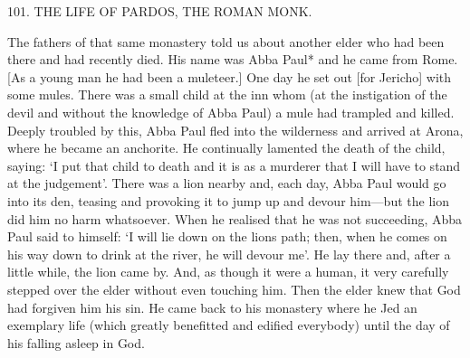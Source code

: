 101.
THE LIFE OF PARDOS, THE ROMAN MONK.

The fathers of that same monastery told us about another elder who
had been there and had recently died.
His name was Abba Paul*
and he came from Rome.
[As a young man he had been a muleteer.]
One day he set out [for Jericho] with some mules.
There was a small
child at the inn whom (at the instigation of the devil and without
the knowledge of Abba Paul) a mule had trampled and killed.
Deeply troubled by this, Abba Paul fled into the wilderness and
arrived at Arona, where he became an anchorite.
He continually
lamented the death of the child, saying: `I put that child to death and it is as a murderer that I will have to stand at the judgement'.
There was a lion nearby and, each day, Abba Paul would go into
its den, teasing and provoking it to jump up and devour him—but
the lion did him no harm whatsoever.
When he realised that he was
not succeeding, Abba Paul said to himself: `I will lie down on the
lion\textquotesingle s path; then, when he comes on his way down to drink at the
river, he will devour me'.
He lay there and, after a little while, the
lion came by.
And, as though it were a human, it very carefully
stepped over the elder without even touching him.
Then the elder
knew that God had forgiven him his sin.
He came back to his
monastery where he Jed an exemplary life (which greatly benefitted
and edified everybody) until the day of his falling asleep in God.
